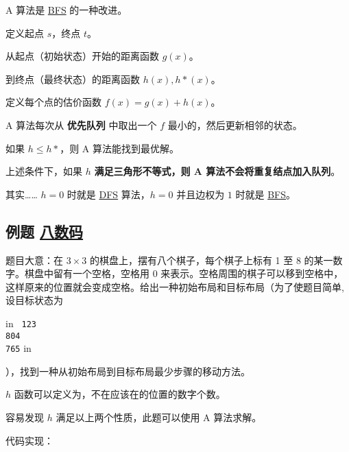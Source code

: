 
A 算法是 \href{/search/bfs}{BFS} 的一种改进。

定义起点 $s$，终点 $t$。

从起点（初始状态）开始的距离函数 $g(x)$。

到终点（最终状态）的距离函数 $h(x), h*(x)$。

定义每个点的估价函数 $f(x)=g(x)+h(x)$。

A 算法每次从 \textbf{优先队列} 中取出一个 $f$ 最小的，然后更新相邻的状态。

如果 $h\leq h*$，则 A 算法能找到最优解。

上述条件下，如果 $h$ \textbf{满足三角形不等式，则 A 算法不会将重复结点加入队列}。

其实…… $h=0$ 时就是 \href{/search/dfs}{DFS} 算法，$h=0$ 并且边权为 $1$ 时就是 \href{/search/BFS}{BFS}。

\subsection{例题 \href{https://www.luogu.org/problemnew/show/P1379}{八数码}}

题目大意：在 $3\times 3$ 的棋盘上，摆有八个棋子，每个棋子上标有 1 至 8 的某一数字。棋盘中留有一个空格，空格用 0 来表示。空格周围的棋子可以移到空格中，这样原来的位置就会变成空格。给出一种初始布局和目标布局（为了使题目简单, 设目标状态为

 in
\texttt{
123\\804\\765}
 in

），找到一种从初始布局到目标布局最少步骤的移动方法。

$h$ 函数可以定义为，不在应该在的位置的数字个数。

容易发现 $h$ 满足以上两个性质，此题可以使用 A 算法求解。

代码实现：

